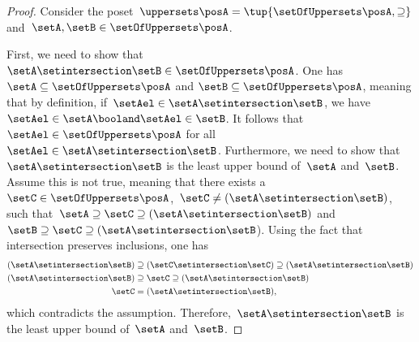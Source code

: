 \begin{proof}
    Consider the poset~$\uppersets \posA=\tup{\setOfUppersets \posA,\supseteq}$ and~$\setA,\setB\in \setOfUppersets \posA$.

    First, we need to show that~$\setA\setintersection \setB\in \setOfUppersets \posA$.
    One has~$\setA \subseteq \setOfUppersets \posA$ and $\setB\subseteq \setOfUppersets \posA$, meaning that by definition, if~$\setAel\in \setA\setintersection \setB$, we have~$\setAel \in \setA \booland \setAel \in \setB$.
    It follows that~$\setAel \in \setOfUppersets \posA$ for all~$\setAel \in \setA\setintersection \setB$.
    Furthermore, we need to show that~$\setA\setintersection \setB$ is the least upper bound of~$\setA$ and~$\setB$.
    Assume this is not true, meaning that there exists a~$\setC\in \setOfUppersets \posA$,~$\setC\neq (\setA\setintersection \setB)$, such that~$\setA\supseteq \setC\supseteq (\setA\setintersection \setB)$ and~$\setB\supseteq \setC\supseteq (\setA\setintersection \setB$).
        Using the fact that intersection preserves inclusions, one has
        \begin{equation}
            \begin{aligned}
                (\setA\setintersection \setB)
                                              & \supseteq (\setC\setintersection \setC) \supseteq (\setA\setintersection \setB ) \\
                (\setA\setintersection \setB) & \supseteq \setC \supseteq (\setA\setintersection \setB )                         \\
                \setC                         & = (\setA\setintersection \setB),
            \end{aligned}
        \end{equation}
        which contradicts the assumption.
        Therefore,~$\setA\setintersection \setB$ is the least upper bound of~$\setA$ and~$\setB$.


\end{proof}
